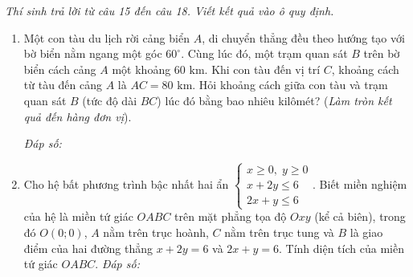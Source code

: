 \documentclass[12pt,a4paper]{article}
\newcommand{\parttitle}[1]{\par\vspace{2pt}{\large\bfseries\color{ink}#1}\par\vspace{1pt}}
\newcommand{\answerbox}{\hfill\textit{Đáp số:}\ \fbox{\rule{0pt}{12pt}\hspace{2.2cm}}}
\begin{document}
\parttitle{PHẦN III. Trắc nghiệm trả lời ngắn}
\textit{Thí sinh trả lời từ câu 15 đến câu 18. Viết kết quả vào ô quy định.}
\begin{enumerate}[resume]
\item \begin{minipage}[t]{0.62\linewidth}
Một con tàu du lịch rời cảng biển $A$, di chuyển thẳng đều theo hướng tạo với bờ biển nằm ngang một góc $60^\circ$. Cùng lúc đó, một trạm quan sát $B$ trên bờ biển cách cảng $A$ một khoảng $60\text{ km}$. Khi con tàu đến vị trí $C$, khoảng cách từ tàu đến cảng $A$ là $AC = 80\text{ km}$. Hỏi khoảng cách giữa con tàu và trạm quan sát $B$ (tức độ dài $BC$) lúc đó bằng bao nhiêu kilômét? (\textit{Làm tròn kết quả đến hàng đơn vị}).
\vspace{6pt}

\answerbox
\end{minipage}%
\hfill
\begin{minipage}[t]{0.35\linewidth}
\centering
{}
\end{minipage}

\item Cho hệ bất phương trình bậc nhất hai ẩn $\begin{cases} x \ge 0,\; y \ge 0 \\ x + 2y \le 6 \\ 2x + y \le 6 \end{cases}$. Biết miền nghiệm của hệ là miền tứ giác $OABC$ trên mặt phẳng tọa độ $Oxy$ (kể cả biên), trong đó $O(0; 0)$, $A$ nằm trên trục hoành, $C$ nằm trên trục tung và $B$ là giao điểm của hai đường thẳng $x + 2y = 6$ và $2x + y = 6$. Tính diện tích của miền tứ giác $OABC$.
\answerbox


\end{enumerate}
\end{document}
